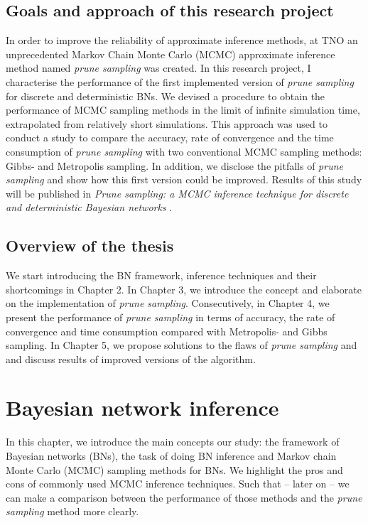 \documentclass[a4paper, twoside, 11pt]{report}
\theoremstyle{plain}
\theoremstyle{definition}
\theoremstyle{remark}
\newcommand{\ps}{\textit{prune sampling }}
\begin{document}
\section{Goals and approach of this research project}
In order to improve the reliability of approximate inference methods, at TNO an unprecedented Markov Chain Monte Carlo (MCMC) approximate inference method named \ps was created. In this research project, I characterise the performance of the first implemented version of \ps for discrete and deterministic BNs. We devised a procedure to obtain the performance of MCMC sampling methods in the limit of infinite simulation time, extrapolated from relatively short simulations. This approach was used to conduct a study to compare the accuracy, rate of convergence and the time consumption of \ps with two conventional MCMC sampling methods: Gibbs- and Metropolis sampling. In addition, we disclose the pitfalls of \ps and show how this first version could be improved. Results of this study will be published in \textit{Prune sampling: a MCMC inference technique for discrete and deterministic Bayesian networks} \cite{phillipson2018}.


\section{Overview of the thesis}
We start introducing the BN framework, inference techniques and their shortcomings in Chapter 2. In Chapter 3, we introduce the concept and elaborate on the implementation of \textit{prune sampling}. Consecutively, in Chapter 4, we present the performance of \ps in terms of accuracy, the rate of convergence and time consumption compared with Metropolis- and Gibbs sampling. In Chapter 5, we propose solutions to the flaws of \ps and and discuss results of improved versions of the algorithm.

\chapter{Bayesian network inference}
In this chapter, we introduce the main concepts our study: the framework of Bayesian networks (BNs), the task of doing BN inference and Markov chain Monte Carlo (MCMC) sampling methods for BNs. We highlight the pros and cons of commonly used MCMC inference techniques. Such that -- later on -- we can make a comparison between the performance of those methods and the \ps method more clearly.
\end{document}
